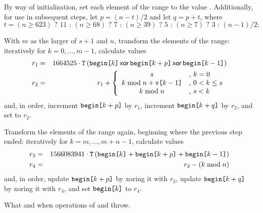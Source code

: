 \begin{itemdescr}
\begin{enumeratea}
 \item
   By way of initialization,
   set each element of the range to the value .
   Additionally,
   for use in subsequent steps,
   let $p = (n - t) / 2$
   and let $q = p + t$,
   where
   \[%
     t = (n \ge 623) \mbox{ ? } 11 \mbox{ : } (n \ge 68) \mbox{ ? } 7 \mbox{ : } (n \ge 39) \mbox{ ? } 5 \mbox{ : } (n \ge 7) \mbox{ ? } 3 \mbox{ : } (n - 1)/2;
   \]%
 \item
   With $m$ as the larger of $s + 1$ and $n$,
   transform the elements of the range:
   iteratively for $ k = 0, \ldots, m-1 $,
   calculate values
   \begin{eqnarray*}
     r_1 & = &
       1664525 \cdot \texttt{T}\left(     \texttt{begin[}k\texttt{]}
                                    \, \mathsf{xor} \, \texttt{begin[}k+p\texttt{]}
                                    \, \mathsf{xor} \, \texttt{begin[}k-1 \texttt{]}
                               \right)
     \\
     r_2 & = & r_1 + \left\{
       \begin{array}{cl}
         s                                  & \mbox{,  } k = 0
         \\
         k \bmod n + \texttt{v[}k-1\texttt{]} & \mbox{,  } 0 < k \le s
         \\
         k \bmod n                          & \mbox{,  } s < k
       \end{array}
     \right.
   \end{eqnarray*}
   and, in order,
   increment $\texttt{begin[}k+p\texttt{]}$ by $r_1$,
   increment $\texttt{begin[}k+q\texttt{]}$ by $r_2$,
   and
   set  to $r_2$.
 \item
   Transform the elements of the range again,
   beginning where the previous step ended:
   iteratively for $ k = m, \ldots, m\!+\!n\!-\!1 $,
   calculate values
   \begin{eqnarray*}
     r_3 & = &
       1566083941 \cdot \texttt{T}\left( \texttt{begin[}k  \texttt{]}
                                      + \texttt{begin[}k+p\texttt{]}
                                      + \texttt{begin[}k-1\texttt{]}
                                 \right)
     \\
     r_4 & = & r_3 - (k \bmod n)
   \end{eqnarray*}
   and, in order,
   \noindent
   update $\texttt{begin[}k+p\texttt{]}$ by xoring it with $r_3$,
   update $\texttt{begin[}k+q\texttt{]}$ by xoring it with $r_4$,
   and
   set $\texttt{begin[}k\texttt{]}$ to $r_4$.
\end{enumeratea}

\pnum\throws
What and when  operations of 
and  throw.
\end{itemdescr}

